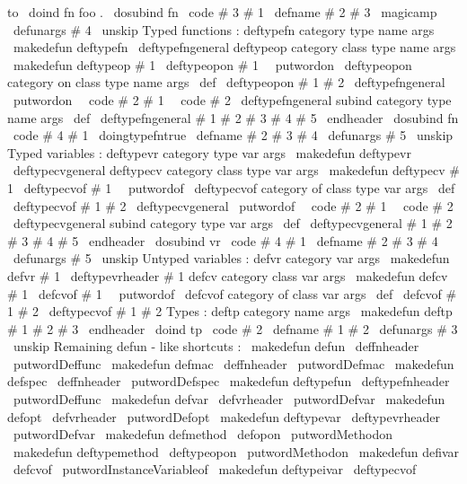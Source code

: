 {{{{{to
\
doind
{
fn
}
{
foo
}
.
\
dosubind
{
fn
}
{
\
code
{
#
3
}
}
{
#
1
}
%
\
defname
{
#
2
}
{
}
{
#
3
}
\
magicamp
\
defunargs
{
#
4
\
unskip
}
%
}
%
Typed
functions
:
%
deftypefn
category
type
name
args
\
makedefun
{
deftypefn
}
{
\
deftypefngeneral
{
}
}
%
deftypeop
category
class
type
name
args
\
makedefun
{
deftypeop
}
#
1
{
\
deftypeopon
{
#
1
\
\
putwordon
}
}
%
\
deftypeopon
{
category
on
}
class
type
name
args
\
def
\
deftypeopon
#
1
#
2
{
\
deftypefngeneral
{
\
putwordon
\
\
code
{
#
2
}
}
{
#
1
\
\
code
{
#
2
}
}
}
%
\
deftypefngeneral
{
subind
}
category
type
name
args
%
\
def
\
deftypefngeneral
#
1
#
2
#
3
#
4
#
5
\
endheader
{
%
\
dosubind
{
fn
}
{
\
code
{
#
4
}
}
{
#
1
}
%
\
doingtypefntrue
\
defname
{
#
2
}
{
#
3
}
{
#
4
}
\
defunargs
{
#
5
\
unskip
}
%
}
%
Typed
variables
:
%
deftypevr
category
type
var
args
\
makedefun
{
deftypevr
}
{
\
deftypecvgeneral
{
}
}
%
deftypecv
category
class
type
var
args
\
makedefun
{
deftypecv
}
#
1
{
\
deftypecvof
{
#
1
\
\
putwordof
}
}
%
\
deftypecvof
{
category
of
}
class
type
var
args
\
def
\
deftypecvof
#
1
#
2
{
\
deftypecvgeneral
{
\
putwordof
\
\
code
{
#
2
}
}
{
#
1
\
\
code
{
#
2
}
}
}
%
\
deftypecvgeneral
{
subind
}
category
type
var
args
%
\
def
\
deftypecvgeneral
#
1
#
2
#
3
#
4
#
5
\
endheader
{
%
\
dosubind
{
vr
}
{
\
code
{
#
4
}
}
{
#
1
}
%
\
defname
{
#
2
}
{
#
3
}
{
#
4
}
\
defunargs
{
#
5
\
unskip
}
%
}
%
Untyped
variables
:
%
defvr
category
var
args
\
makedefun
{
defvr
}
#
1
{
\
deftypevrheader
{
#
1
}
{
}
}
%
defcv
category
class
var
args
\
makedefun
{
defcv
}
#
1
{
\
defcvof
{
#
1
\
\
putwordof
}
}
%
\
defcvof
{
category
of
}
class
var
args
\
def
\
defcvof
#
1
#
2
{
\
deftypecvof
{
#
1
}
#
2
{
}
}
%
Types
:
%
deftp
category
name
args
\
makedefun
{
deftp
}
#
1
#
2
#
3
\
endheader
{
%
\
doind
{
tp
}
{
\
code
{
#
2
}
}
%
\
defname
{
#
1
}
{
}
{
#
2
}
\
defunargs
{
#
3
\
unskip
}
%
}
%
Remaining
defun
-
like
shortcuts
:
\
makedefun
{
defun
}
{
\
deffnheader
{
\
putwordDeffunc
}
}
\
makedefun
{
defmac
}
{
\
deffnheader
{
\
putwordDefmac
}
}
\
makedefun
{
defspec
}
{
\
deffnheader
{
\
putwordDefspec
}
}
\
makedefun
{
deftypefun
}
{
\
deftypefnheader
{
\
putwordDeffunc
}
}
\
makedefun
{
defvar
}
{
\
defvrheader
{
\
putwordDefvar
}
}
\
makedefun
{
defopt
}
{
\
defvrheader
{
\
putwordDefopt
}
}
\
makedefun
{
deftypevar
}
{
\
deftypevrheader
{
\
putwordDefvar
}
}
\
makedefun
{
defmethod
}
{
\
defopon
\
putwordMethodon
}
\
makedefun
{
deftypemethod
}
{
\
deftypeopon
\
putwordMethodon
}
\
makedefun
{
defivar
}
{
\
defcvof
\
putwordInstanceVariableof
}
\
makedefun
{
deftypeivar
}
{
\
deftypecvof
}}}}}
